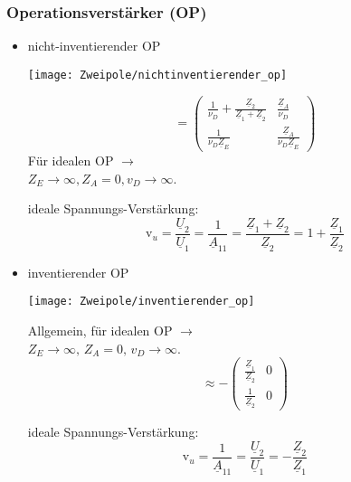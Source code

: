 \subsubsection{Operationsverstärker (OP)}
\begin{itemize}[leftmargin=*]
	\item nicht-inventierender OP\\
			\begin{minipage}{0.4\columnwidth}
				\texttt{[image: Zweipole/nichtinventierender\_op]}
			\end{minipage}
			\begin{minipage}{0.6\columnwidth}
				\renewcommand*{\arraystretch}{1.7}
				\begin{equation*}
					[\underline{A}] = \begin{pmatrix}
						\frac{1}{\nu_D} + \frac{\underline{Z}_2}{\underline{Z}_1 + \underline{Z}_2} & \frac{\underline{Z}_A}{\nu_D} \\
						\frac{1}{\nu_D \underline{Z}_E} & \frac{\underline{Z}_A}{\nu_D \underline{Z}_E}
					\end{pmatrix}
				\end{equation*}
			Für idealen OP $\rightarrow$ \\
			$Z_E\rightarrow\infty, Z_A=0, v_D\rightarrow\infty$.
			\vspace{1.1em}
			\end{minipage}
			ideale Spannungs-Verstärkung:
			\begin{equation*}
				\text{v}_u=\frac{\underline{U}_2}{\underline{U}_1}=
				\frac{1}{\underline{A}_{11}}=\frac{\underline{Z}_1+\underline{Z}_2}{\underline{Z}_2} = 1 + \frac{\underline{Z}_1}{\underline{Z}_2}
			\end{equation*}
	\item inventierender OP\\
	\begin{minipage}{0.4\columnwidth}
		\texttt{[image: Zweipole/inventierender\_op]}
	\end{minipage}
	\begin{minipage}{0.6\columnwidth}
		\renewcommand*{\arraystretch}{1.7}
		Allgemein, für idealen OP $\rightarrow$ \\
		$Z_E\rightarrow\infty,\, Z_A=0,\, v_D\rightarrow\infty$.
		\begin{equation*}
			[\underline{A}] \approx - \begin{pmatrix}
				\frac{\underline{Z}_1}{\underline{Z}_2} & 0 \\
				\frac{1}{\underline{Z}_2} & 0
			\end{pmatrix}
		\end{equation*}
			\vspace{1em}
	\end{minipage}
			ideale Spannungs-Verstärkung:
	\begin{equation*}
		\text{v}_u=\frac{1}{\underline{A}_{11}}=\frac{\underline{U}_2}{\underline{U}_1}=-\frac{\underline{Z}_2}{\underline{Z}_1}
	\end{equation*}
\end{itemize}

